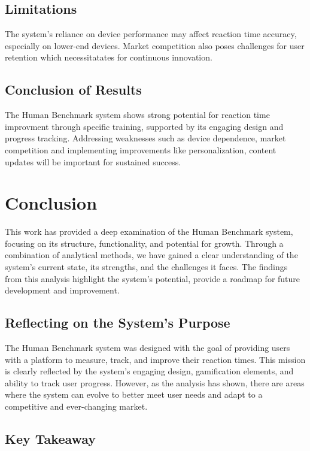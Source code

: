 \documentclass[]{VUMIFTemplateClass}
\begin{document}
\subsection{Limitations}
The system's reliance on device performance may affect reaction time accuracy, especially on lower-end 
devices. Market competition also poses challenges for user retention which necessitatates for continuous 
innovation.

\subsection{Conclusion of Results}
The Human Benchmark system shows strong potential for reaction time improvment through specific training, supported by its engaging 
design and progress tracking. Addressing weaknesses such as device dependence, market competition and implementing improvements like 
personalization, content updates will be important for sustained success.




\section{Conclusion}
\label{sec:conclusion}
This work has provided a deep examination of the Human Benchmark system, 
focusing on its structure, functionality, and potential for growth. 
Through a combination of analytical methods, we have gained a clear understanding of the system's current state, its strengths, and the challenges it faces. 
The findings from this analysis highlight the system's potential, provide a roadmap for future development and improvement.

\subsection{Reflecting on the System's Purpose}
The Human Benchmark system was designed with the goal 
of providing users with a platform to measure, track, 
and improve their reaction times. This mission is clearly reflected
by the system's engaging design, gamification elements, and 
ability to track user progress. However, as the analysis has 
shown, there are areas where the system can evolve to better 
meet user needs and adapt to a competitive and ever-changing
market.

\subsection{Key Takeaway}
\end{document}

